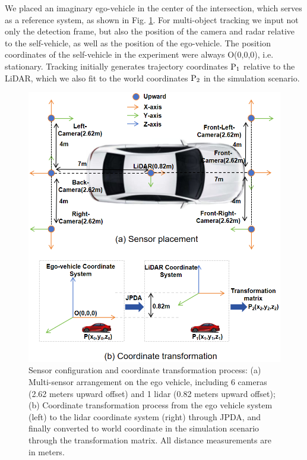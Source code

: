 \documentclass[lettersize,journal]{IEEEtran}
\begin{document}
We placed an imaginary ego-vehicle in the center of the intersection, which serves as a reference system, as shown in Fig. \ref{fig:3}. 
For multi-object tracking we input not only the detection frame, but also the position of the camera and radar relative to the self-vehicle, as well as the position of the ego-vehicle. 
The position coordinates of the self-vehicle in the experiment were always O(0,0,0), i.e. stationary. 
Tracking initially generates trajectory coordinates \(\text P_1\) relative to the LiDAR, which we also fit to the world coordinates \(\text P_2\) in the simulation scenario.
\begin{figure}[t]
	\centering
	\includegraphics[width=\linewidth]{picture/picture3.png} 
	\caption{Sensor configuration and coordinate transformation process: (a) Multi-sensor arrangement on the ego vehicle, including 6 cameras (2.62 meters upward offset) and 1 lidar (0.82 meters upward offset); (b) Coordinate transformation process from the ego vehicle system (left) to the lidar coordinate system (right) through JPDA, and finally converted to world coordinate in the simulation scenario through the transformation matrix. All distance measurements are in meters.} 
	\label{fig:3} 
\end{figure}
\end{document}
